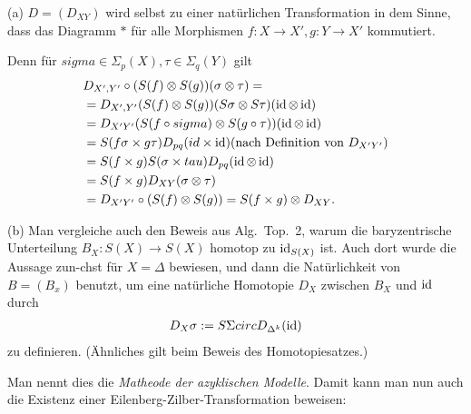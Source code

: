 \begin{kommentar}
	(a) $D = (D_{XY})$ wird selbst zu einer natürlichen Transformation in dem Sinne, dass das Diagramm $\ast$ für alle Morphismen $f : X \rightarrow X', g: Y \rightarrow X'$ kommutiert.
	
	Denn für $sigma \in \Sigma_p(X), \tau \in \Sigma_q(Y)$ gilt
	\begin{align*}
	& D_{X',Y'} \circ (S(f) \otimes S(g)) (\sigma \otimes \tau) =\\
	&= D_{X',Y'}(S(f) \otimes S(g))(S\sigma \otimes S\tau)(\operatorname{id} \otimes \operatorname{id})\\
	&= D_{X'Y'}(S(f \circ sigma) \otimes S(g \circ \tau))(\operatorname{id} \otimes \operatorname{id})\\
	&= S(f\sigma \times g\tau) D_{pq}(id\times \operatorname{id}) \textrm{(nach Definition von $D_{X'Y'}$)}\\
	&=S(f \times g) S(\sigma \times tau) D_{pq} (\operatorname{id} \otimes \operatorname{id}) \\
	&= S(f \times g) D_{XY} (\sigma \otimes \tau) \\
	&= D_{X'Y'} \circ (S(f) \otimes S(g)) = S(f \times g) \otimes D_{XY}.
	\end{align*}
	
	(b) Man vergleiche auch den Beweis aus Alg.~Top.~2, warum die baryzentrische Unterteilung $B_X : S(X) \rightarrow S(X)$ homotop zu $\operatorname{id}_{S(X)}$ ist. Auch dort wurde die Aussage zun-chst für $X = \Delta$ bewiesen, und dann die Natürlichkeit von $B = (B_x)$ benutzt, um eine natürliche Homotopie $D_X$ zwischen $B_X$ und $\operatorname{id}$ durch
	\begin{align*}
	D_X\sigma := S\Sigma circ D_{\Delta^k}(\operatorname{id})
	\end{align*}
	zu definieren. (Ähnliches gilt beim Beweis des Homotopiesatzes.)
	
	Man nennt dies die \textit{Matheode der azyklischen Modelle}. Damit kann man nun auch die Existenz einer Eilenberg-Zilber-Transformation beweisen:
\end{kommentar}
	
